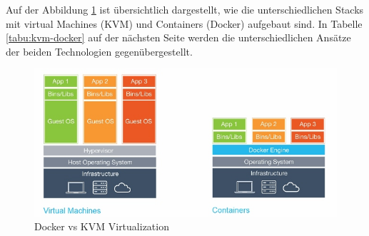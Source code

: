 Auf der Abbildung \ref{fig:dockervirtualization} ist übersichtlich dargestellt, wie die unterschiedlichen Stacks mit virtual Machines (KVM) und Containers (Docker) aufgebaut sind. In Tabelle \ref{tabu:kvm-docker} auf der nächsten Seite werden die unterschiedlichen Ansätze der beiden Technologien gegenübergestellt.

\begin{figure}[h]
\centering
\includegraphics[width=0.7\linewidth]{images/docker_virtualization}
\caption{Docker vs KVM Virtualization}
\label{fig:dockervirtualization}
\end{figure}

